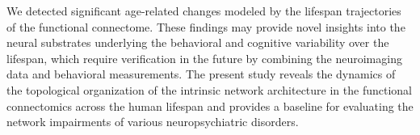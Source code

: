We detected significant age-related changes modeled
by the lifespan trajectories of the functional connectome.
These findings may provide novel insights into the neural
substrates underlying the behavioral and cognitive variability 
over the lifespan, which require verification in the
future by combining the neuroimaging data and behavioral
measurements. The present study reveals the dynamics of
the topological organization of the intrinsic network architecture 
in the functional connectomics across the human
lifespan and provides a baseline for evaluating the network
impairments of various neuropsychiatric disorders.
\cite{Cao2014}


